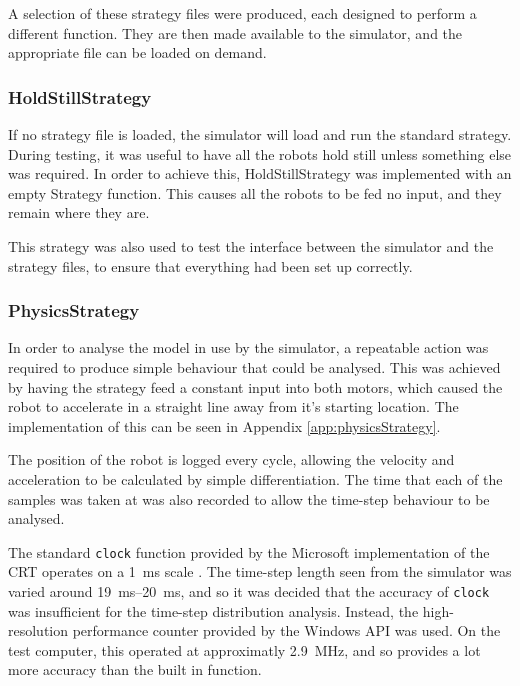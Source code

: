 \documentclass[10pt]{article}
\begin{document}
A selection of these strategy files were produced, each designed to perform a
different function.  They are then made available to the simulator, and the
appropriate file can be loaded on demand.

\subsubsection{HoldStillStrategy}

If no strategy file is loaded, the simulator will load and run the standard
strategy.  During testing, it was useful to have all the robots hold still
unless something else was required.  In order to achieve this, HoldStillStrategy
was implemented with an empty Strategy function.  This causes all the robots to
be fed no input, and they remain where they are.

This strategy was also used to test the interface between the simulator and the
strategy files, to ensure that everything had been set up correctly.

\subsubsection{PhysicsStrategy}

In order to analyse the model in use by the simulator, a repeatable
action was required to produce simple behaviour that could be analysed.  This
was achieved by having the strategy feed a constant input into both motors,
which caused the robot to accelerate in a straight line away from it's starting
location.  The implementation of this can be seen in Appendix
\ref{app:physicsStrategy}.

The position of the robot is logged every cycle, allowing the velocity and
acceleration to be calculated by simple differentiation.  The time that each of
the samples was taken at was also recorded to allow the time-step behaviour to be
analysed.

The standard \texttt{clock} function provided by the Microsoft implementation of
the CRT operates on a \SI{1}{\milli\second} scale \cite{windowsSDK}.  The
time-step length seen from the simulator was varied around
\SIrange{19}{20}{\milli\second}, and so it was decided that the accuracy of
\texttt{clock} was insufficient for the time-step distribution analysis.
Instead, the high-resolution performance counter provided by the Windows API was
used.  On the test computer, this operated at approximatly
\SI{2.9}{\mega\hertz}, and so provides a lot more accuracy than the built in
function.  
\end{document}
